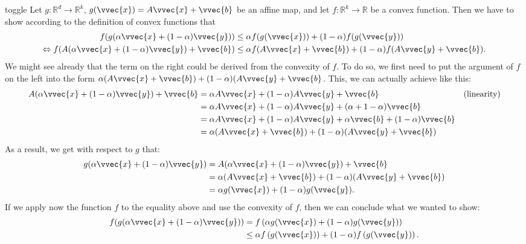 \documentclass[letterpaper,10pt,english]{jupyterBook}
\begin{document}
\begin{enumerate}
\begin{sphinxuseclass}{toggle}
\sphinxAtStartPar
Let \(g:\mathbb{R}^d\rightarrow \mathbb{R}^k\), \(g(\vvec{x})=A\vvec{x}+\vvec{b}\) be an affine map, and let \(f:\mathbb{R}^k\rightarrow \mathbb{R}\) be a convex function.
Then we have to show according to the definition of convex functions that
\begin{align*}
    f(g(\alpha\vvec{x}+(1-\alpha)\vvec{y}))&\leq \alpha f(g(\vvec{x}))+(1-\alpha)f(g(\vvec{y}))\\
    \Leftrightarrow f(A(\alpha\vvec{x}+(1-\alpha)\vvec{y})+\vvec{b})&\leq\alpha f(A\vvec{x}+\vvec{b})+(1-\alpha)f(A\vvec{y}+\vvec{b}).
\end{align*}
\sphinxAtStartPar
We might see already that the term on the right could be derived from the convexity of \(f\). To do so, we first need to put the argument of \(f\) on the left into the form \(\alpha (A\vvec{x}+\vvec{b})+(1-\alpha)(A\vvec{y}+\vvec{b}\). This, we can actually achieve like this:
\begin{align*}
    A(\alpha\vvec{x}+(1-\alpha)\vvec{y})+\vvec{b} &= \alpha A\vvec{x}+(1-\alpha)A\vvec{y}+\vvec{b} & \text{(linearity)} \\
    &= \alpha A\vvec{x}+(1-\alpha)A\vvec{y}+(\alpha + 1-\alpha)\vvec{b}\\
    &=\alpha A\vvec{x}+(1-\alpha)A\vvec{y}+\alpha\vvec{b} + (1-\alpha)\vvec{b}\\
    &=\alpha (A\vvec{x}+\vvec{b})+(1-\alpha)(A\vvec{y}+\vvec{b})
\end{align*}
\sphinxAtStartPar
As a result, we get with respect to \(g\) that:
\begin{align*}
    g(\alpha\vvec{x}+(1-\alpha)\vvec{y}) &=
    A(\alpha\vvec{x}+(1-\alpha)\vvec{y})+\vvec{b}\\
    &=\alpha (A\vvec{x}+\vvec{b})+(1-\alpha)(A\vvec{y}+\vvec{b})\\
    &= \alpha g(\vvec{x}) + (1-\alpha)g(\vvec{y}).
\end{align*}
\sphinxAtStartPar
If we apply now the function \(f\) to the equality above and use the convexity of \(f\), then we can conclude what we wanted to show:
\begin{align*}
    f(g(\alpha\vvec{x}+(1-\alpha)\vvec{y}))&= f\left(\alpha g(\vvec{x}) + (1-\alpha)g(\vvec{y})\right)\\
    &\leq \alpha f\left( g(\vvec{x})\right) + (1-\alpha) f\left(g(\vvec{y})\right).
\end{align*}
\end{sphinxuseclass}
\end{enumerate}
\end{document}
